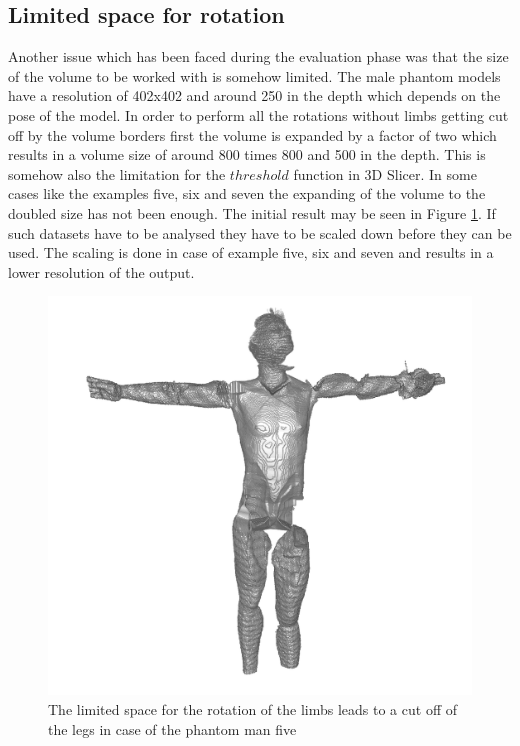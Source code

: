 \subsection{Limited space for rotation}

Another issue which has been faced during the evaluation phase was that the size of the volume to be worked with is somehow limited. The male phantom models have a resolution of 402x402 and around 250 in the depth which depends on the pose of the model. In order to perform all the rotations without limbs getting cut off by the volume borders first the volume is expanded by a factor of two which results in a volume size of around 800 times 800 and 500 in the depth. This is somehow also the limitation for the $threshold$ function in 3D Slicer. In some cases like the examples five, six and seven the expanding of the volume to the doubled size has not been enough. The initial result may be seen in Figure \ref{fig:rotationProblem}. If such datasets have to be analysed they have to be scaled down before they can be used. The scaling is done in case of  example five, six and seven and results in a lower resolution of the output.

\begin{figure} [htb!]
    \centering
	\includegraphics[width=14cm]{content/images/influence/rotationalProblem.png}
	\caption{The limited space for the rotation of the limbs leads to a cut off of the legs in case of the phantom man five}
	\label{fig:rotationProblem}
\end{figure}
